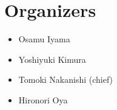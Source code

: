 \documentclass[
]{article}
\begin{document}
\section*{Organizers}\label{organizers}

\begin{itemize}
\item
  Osamu Iyama
\item
  Yoshiyuki Kimura
\item
  Tomoki Nakanishi (chief)
\item
  Hironori Oya
\end{itemize}
\end{document}

